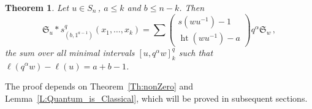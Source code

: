 \documentclass[12pt,oneside,reqno]{amsart}
\newtheorem{theorem}{Theorem}[section]
\theoremstyle{definition}
\numberwithin{equation}{section}
\newcommand{\frakS}{{\mathfrak S}}
\DeclareMathOperator{\het}{ht}
\begin{document}
\begin{theorem}
    \label{thm:q_hook_product}
    Let $u \in S_n$\,, $a \leq k$ and $b \leq n-k$. Then
    \begin{equation*}
        \frakS_u
        \ast
        s^q_{(b,1^{a-1})} (x_1, \dots, x_k)
        = \sum
        \left(\begin{smallmatrix} s(wu^{-1})-1 \\ \het(wu^{-1})-a \end{smallmatrix}\right)
        q^\alpha
        \frakS_{w}\,,
    \end{equation*}
    the sum over all minimal intervals $[u,  q^{\alpha}w]_k^q$ such that $\ell(q^\alpha w) - \ell(u)= a{+}b{-}1$.
\end{theorem}

The proof depends on  Theorem~\ref{Th:nonZero} and Lemma~\ref{L:Quantum_is_Classical}, which will be proved in
subsequent sections.
\end{document}
